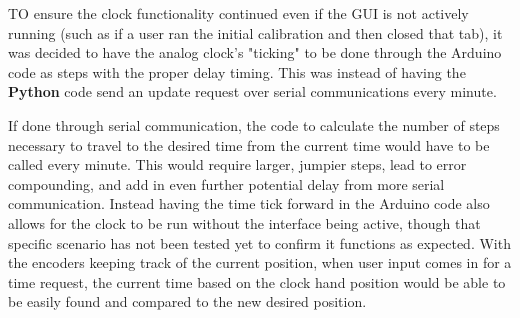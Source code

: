 \documentclass[11pt]{article}
\begin{document}


TO ensure the clock functionality continued even if the GUI is not actively running (such as if a user ran the initial calibration and then closed that tab), it was decided to have the analog clock's "ticking" to be done through the Arduino code as steps with the proper delay timing. This was instead of having the \textbf{Python} code send an update request over serial communications every minute. 

If done through serial communication, the code to calculate the number of steps necessary to travel to the desired time from the current time would have to be called every minute. 
This would require larger, jumpier steps, lead to error compounding, and add in even further potential delay from more serial communication. 
Instead having the time tick forward in the Arduino code also allows for the clock to be run without the interface being active, though that specific scenario has not been tested yet to confirm it functions as expected. 
With the encoders keeping track of the current position, when user input comes in for a time request, the current time based on the clock hand position would be able to be easily found and compared to the new desired position. 



\end{document}

